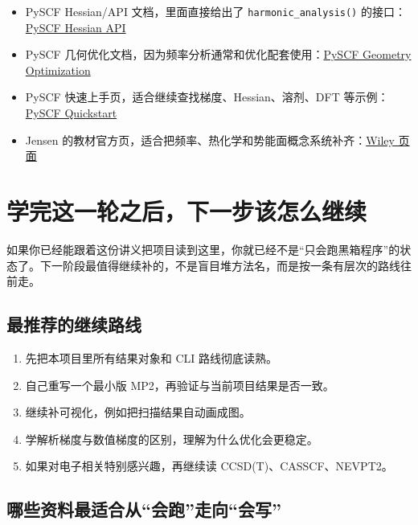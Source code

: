 \documentclass[UTF8,11pt,fontset=fandol]{ctexbook}
\begin{document}
\begin{resourcebox}[继续学习资料]
\begin{itemize}
  \item PySCF Hessian/API 文档，里面直接给出了 \texttt{harmonic\_analysis()} 的接口：\href{https://pyscf.org/pyscf_api_docs/pyscf.hessian.html}{PySCF Hessian API}
  \item PySCF 几何优化文档，因为频率分析通常和优化配套使用：\href{https://pyscf.org/user/geomopt.html}{PySCF Geometry Optimization}
  \item PySCF 快速上手页，适合继续查找梯度、Hessian、溶剂、DFT 等示例：\href{https://pyscf.org/quickstart.html}{PySCF Quickstart}
  \item Jensen 的教材官方页，适合把频率、热化学和势能面概念系统补齐：\href{https://www.wiley-vch.de/en/areas-interest/natural-sciences/introduction-to-computational-chemistry-978-1-118-82599-0}{Wiley 页面}
\end{itemize}
\end{resourcebox}

\chapter{学完这一轮之后，下一步该怎么继续}

\begin{goalbox}[阶段性路线图]
如果你已经能跟着这份讲义把项目读到这里，你就已经不是“只会跑黑箱程序”的状态了。下一阶段最值得继续补的，不是盲目堆方法名，而是按一条有层次的路线往前走。
\end{goalbox}

\section{最推荐的继续路线}

\begin{enumerate}[label=\arabic*.]
  \item 先把本项目里所有结果对象和 CLI 路线彻底读熟。
  \item 自己重写一个最小版 MP2，再验证与当前项目结果是否一致。
  \item 继续补可视化，例如把扫描结果自动画成图。
  \item 学解析梯度与数值梯度的区别，理解为什么优化会更稳定。
  \item 如果对电子相关特别感兴趣，再继续读 CCSD(T)、CASSCF、NEVPT2。
\end{enumerate}

\section{哪些资料最适合从“会跑”走向“会写”}
\end{document}
